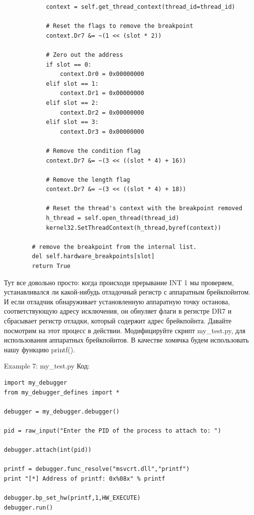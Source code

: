 \documentclass[12pt]{book}
\begin{document}
\begin{lstlisting}
            context = self.get_thread_context(thread_id=thread_id)

            # Reset the flags to remove the breakpoint
            context.Dr7 &= ~(1 << (slot * 2))

            # Zero out the address
            if slot == 0:
                context.Dr0 = 0x00000000
            elif slot == 1:
                context.Dr1 = 0x00000000
            elif slot == 2:
                context.Dr2 = 0x00000000
            elif slot == 3:
                context.Dr3 = 0x00000000

            # Remove the condition flag
            context.Dr7 &= ~(3 << ((slot * 4) + 16))

            # Remove the length flag
            context.Dr7 &= ~(3 << ((slot * 4) + 18))

            # Reset the thread's context with the breakpoint removed
            h_thread = self.open_thread(thread_id)
            kernel32.SetThreadContext(h_thread,byref(context))

        # remove the breakpoint from the internal list.
        del self.hardware_breakpoints[slot]
        return True
\end{lstlisting}

Тут все довольно просто: когда происходи прерывание INT 1 мы проверяем, устанавливался ли какой-нибудь отладочный регистр с аппаратным брейкпойнтом. И если отладчик обнаруживает установленную аппаратную точку останова, соответствующую адресу исключения, он обнуляет флаги в регистре DR7 и сбрасывает регистр отладки, который содержит адрес брейкпойнта. Давайте посмотрим на этот процесс в действии. Модифицируйте скрипт my\_test.py, для использования аппаратных брейкпойнтов. В качестве хомячка будем использовать нашу функцию printf().

Example 7: my\_test.py
Код:
\begin{lstlisting}
import my_debugger
from my_debugger_defines import *

debugger = my_debugger.debugger()

pid = raw_input("Enter the PID of the process to attach to: ")

debugger.attach(int(pid))

printf = debugger.func_resolve("msvcrt.dll","printf")
print "[*] Address of printf: 0x%08x" % printf

debugger.bp_set_hw(printf,1,HW_EXECUTE)
debugger.run()
\end{lstlisting}
\end{document}
